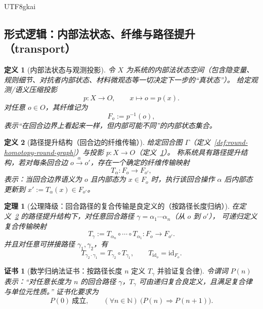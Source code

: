 \documentclass[12pt]{article}
\newtheorem{definition}{定义}[section]
\newtheorem{theorem}{定理}[section]
\newtheorem{Certificate}{证书}[section]
\newcommand{\NN}{\mathbb{N}}
\begin{document}
\begin{CJK*}{UTF8}{gkai}
\subsection{形式逻辑：内部法状态、纤维与路径提升（transport）}
\label{sec:round-homotopy-fiber-transport}

\begin{definition}[内部法状态与观测投影]
\label{def:round-homotopy-internal-state}
令 $X$ 为系统的内部法状态空间（包含隐变量、规则细节、对抗者内部状态、材料微观态等一切决定下一步的“真状态”）。
给定观测/语义压缩投影
\[
  p:X\to O,\qquad x\mapsto o=p(x).
\]
对任意 $o\in O$，其纤维记为
\[
  F_o:=p^{-1}(o),
\]
表示“在回合边界上看起来一样，但内部可能不同”的内部状态集合。
\end{definition}

\begin{definition}[路径提升结构（回合边的纤维传输）]
\label{def:round-homotopy-path-lift}
给定回合图 $\Gamma$（定义~\ref{def:round-homotopy-round-graph}）与投影 $p:X\to O$（定义~\ref{def:round-homotopy-internal-state}）。
称系统具有路径提升结构，若对每条回合边 $o\xrightarrow{\alpha}o'$，存在一个确定的纤维传输映射
\[
  T_{\alpha}:F_o\to F_{o'},
\]
表示：当回合边界语义为 $o$ 且内部态为 $x\in F_o$ 时，执行该回合操作 $\alpha$ 后内部态更新到 $x':=T_{\alpha}(x)\in F_{o'}$。
\end{definition}

\begin{theorem}[公理降级：回合路径的复合传输是良定义的（按路径长度归纳）]
\label{thm:round-homotopy-transport-composition}
在定义~\ref{def:round-homotopy-path-lift} 的路径提升结构下，对任意回合路径 $\gamma=\alpha_1\cdots\alpha_n$（从 $o$ 到 $o'$），
可递归定义复合传输映射
\[
  T_{\gamma}:=T_{\alpha_n}\circ\cdots\circ T_{\alpha_1}:F_o\to F_{o'}.
\]
并且对任意可拼接路径 $\gamma_1,\gamma_2$，有
\[
  T_{\gamma_2\cdot\gamma_1}=T_{\gamma_2}\circ T_{\gamma_1},
  \qquad
  T_{\mathrm{id}_o}=\mathrm{id}_{F_o}.
\]
\end{theorem}

\begin{Certificate}[数学归纳法证书：按路径长度 $n$ 定义 $T_\gamma$ 并验证复合律]
\label{cert:round-homotopy-transport-composition}
令谓词 $P(n)$ 表示：“对任意长度为 $n$ 的回合路径 $\gamma$，$T_\gamma$ 可由递归复合良定义，且满足复合律与单位元性质。”
证书化要求为
\[
  P(0)\ \text{成立},\qquad (\forall n\in\NN)\ \bigl(P(n)\Rightarrow P(n+1)\bigr).
\]
\end{Certificate}


\end{CJK*}
\end{document}
